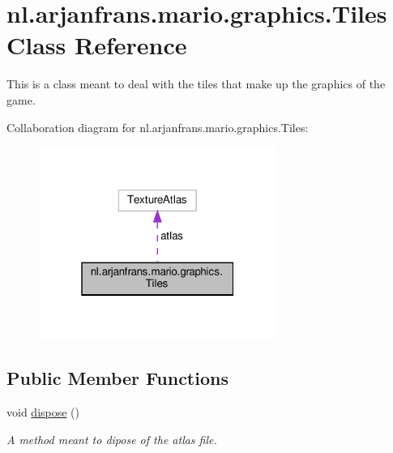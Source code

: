 \hypertarget{classnl_1_1arjanfrans_1_1mario_1_1graphics_1_1Tiles}{}\section{nl.\+arjanfrans.\+mario.\+graphics.\+Tiles Class Reference}
\label{classnl_1_1arjanfrans_1_1mario_1_1graphics_1_1Tiles}


This is a class meant to deal with the tiles that make up the graphics of the game.  




Collaboration diagram for nl.\+arjanfrans.\+mario.\+graphics.\+Tiles\+:\nopagebreak
\begin{figure}[H]
\begin{center}
\leavevmode
\includegraphics[width=220pt]{classnl_1_1arjanfrans_1_1mario_1_1graphics_1_1Tiles__coll__graph}
\end{center}
\end{figure}
\subsection*{Public Member Functions}
\begin{DoxyCompactItemize}
\item 
\mbox{\label{classnl_1_1arjanfrans_1_1mario_1_1graphics_1_1Tiles_a6e93b266076f60eeda8661bc0619dd8a}} 
void \hyperlink{classnl_1_1arjanfrans_1_1mario_1_1graphics_1_1Tiles_a6e93b266076f60eeda8661bc0619dd8a}{dispose} ()
\begin{DoxyCompactList}\small\item\em A method meant to dipose of the atlas file. \end{DoxyCompactList}\end{DoxyCompactItemize}
